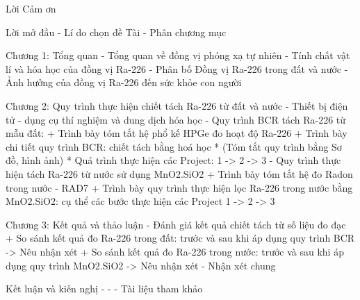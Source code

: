 Lời Cảm ơn 

Lời mở đầu
- Lí do chọn đề Tài
- Phân chương mục


Chương 1: Tổng quan
- Tổng quan về đồng vị phóng xạ tự nhiên  
- Tính chất vật lí và hóa học của đồng vị Ra-226  
- Phân bố Đồng vị Ra-226 trong đất và nước 
- Ảnh hưởng của đồng vị Ra-226 đến sức khỏe con người

Chương 2: Quy trình thực hiện chiết tách Ra-226 từ đất và nước 
- Thiết bị điện tử - dụng cụ thí nghiệm và dung dịch hóa học 
- Quy trình BCR tách Ra-226 từ mẫu đất: 
    + Trình bày tóm tắt hệ phổ kế HPGe đo hoạt độ Ra-226
    + Trình bày chi tiết quy trình BCR: chiết tách bằng hoá học 
        * (Tóm tắt quy trình bằng Sơ đồ, hình ảnh)
        * Quá trình thực hiện các Project: 1 -> 2 -> 3
- Quy trình thực hiện tách Ra-226 từ nước sử dụng MnO2.SiO2
    + Trình bày tóm tắt hệ đo Radon trong nước - RAD7
    + Trình bày quy trình thực hiện lọc Ra-226 trong nước bằng MnO2.SiO2: cụ thể các bước thực hiện các Project 1 -> 2 -> 3 
 
Chương 3: Kết quả và thảo luận 
 - Đánh giá kết quả chiết tách từ số liệu đo đạc 
    + So sánh kết quả đo Ra-226 trong đất: trước và sau khi áp dụng quy trình BCR -> Nêu nhận xét
    + So sánh kết quả đo Ra-226 trong nước: trước và sau khi áp dụng quy trình MnO2.SiO2 -> Nêu nhận xét
 - Nhận xét chung

Kết luận và kiến nghị
    - 
    - 
    - 
Tài liệu tham khảo


